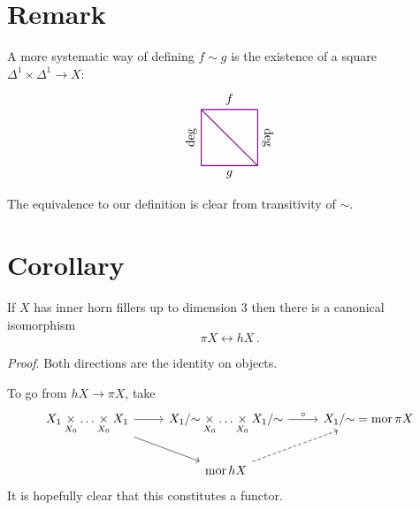     \section{Remark}\label{chII-30}
        A more systematic way of defining $f \sim g$ is the existence of a square $\Delta^1 \times \Delta^1 \to X$:
        \begin{equation*}
            \begin{tikzpicture}[
                scale=0.8, 
                thick, 
                color=violet, 
                every node/.style={text=black}
            ]

                \coordinate (TL) at (0,2); %
                \coordinate (TR) at (2,2); %
                \coordinate (BL) at (0,0); %
                \coordinate (BR) at (2,0); %

                \draw (TL) -- node[above] {$f$} (TR);
                \draw (BL) -- node[below] {$g$} (BR);
    
                \draw (BL) -- node[above, rotate=90] {$\text{deg}$} (TL);
                \draw (BR) -- node[above, rotate=-90] {$\text{deg}$} (TR);

                \draw (TL) -- node[sloped, below] {} (BR);

            \end{tikzpicture}            
        \end{equation*}
        The equivalence to our definition is clear from transitivity of $\sim$.

    \section{Corollary}\label{chII-31}
        If $X$ has inner horn fillers up to dimension $3$ then there is a canonical isomorphism
        \begin{equation*}
            \pi X \longleftrightarrow h X \,.
        \end{equation*}
        \smallskip

        \emph{Proof}. Both directions are the identity on objects.

        To go from $hX \to \pi X$, take
        \begin{equation*}
            \begin{tikzcd}
                \longpb{X_1}{X_0} \arrow[r] \arrow[dr] & \longpb{{X_1}/{\sim}}{X_0} \arrow[r, "\circ"] & {X_1}/{\sim} = \mor \pi X \\
                & \mor hX \arrow[ur, dashed] &
            \end{tikzcd}
        \end{equation*}
        It is hopefully clear that this constitutes a functor.

